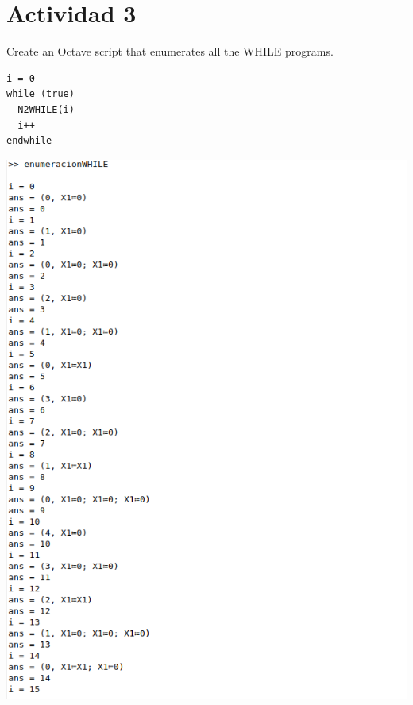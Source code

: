 \documentclass[fleqn, 10pt]{article}
\begin{document}
\section*{Actividad 3}
Create an Octave script that enumerates all the WHILE programs.
\begin{verbatim}
i = 0
while (true)
  N2WHILE(i)
  i++
endwhile
\end{verbatim}
\includegraphics[scale=0.5]{While}
\end{document}
